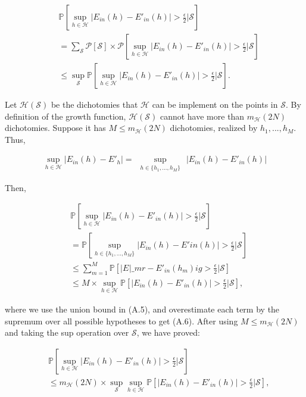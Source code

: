 \begin{align}
    & \ \mathbb{P} \left[\sup_{h \in \mathcal{H}} | E_{in}(h) - E'_{in}(h) | > \frac{\epsilon}{2} \Big\vert \mathcal{S} \right] \nonumber \\ & \ = \sum_{\mathcal{S}} \mathcal{P} \left[\mathcal{S}  \right] \times \mathcal{P} \left[\sup_{h \in \mathcal{H}} |E_{in}(h) - E'_{in}(h) | > \frac{\epsilon}{2} \Big\vert \mathcal{S}  \right] \nonumber \\ & \ \leq \sup_{\mathcal{S}} \mathbb{P} \left[\sup_{h \in \mathcal{H}} | E_{in}(h) - E'_{in}(h) | > \frac{\epsilon}{2} \Big\vert \mathcal{S} \right].
\end{align}

Let $\mathcal{H}(\mathcal{S})$ be the dichotomies that $\mathcal{H}$ can be implement on the points in $\mathcal{S}$. By definition of the growth function, $\mathcal{H}(\mathcal{S})$ cannot have more than $m_{\mathcal{H}}(2N)$ dichotomies. Suppose it has $M \leq m_{\mathcal{H}}(2N)$ dichotomies, realized by $h_1,..., h_M$.
Thus,

\begin{align}
    \sup_{h \in \mathcal{H}} | E_{in}(h) - E'_{h} | = \ \ \sup_{h \in \{h_1,..., h_M\}} \ \ | E_{in}(h) - E'_{in}(h) | \nonumber
\end{align}

Then,

\begin{align}
   & \ \mathbb{P} \left[\sup_{h \in \mathcal{H}} | E_{in}(h) - E'_{in}(h) | > \frac{\epsilon}{2} \Big\vert \mathcal{S} \right] \nonumber \\ & \ = \mathbb{P} \left[\sup_{h \in \{h_1,..., h_M\}} | E_{in}(h) - E'{in}(h) | > \frac{\epsilon}{2} \Big\vert \mathcal{S} \right] \nonumber \\ & \ \leq \sum_{m=1}^M \mathbb{P} \left[| E_{} | \_mr - E'_{in}(h_m)ig > \frac{\epsilon}{2} \Big\vert \mathcal{S} \right] \\ & \ \leq M \times \sup_{h \in \mathcal{H}} \mathbb{P} \left[ | E_{in}(h) - E'_{in}(h) | > \frac{\epsilon}{2} \Big\vert \mathcal{S} \right],
\end{align}

where we use the union bound in (A.5), and overestimate each term by the supremum over all possible hypotheses to get (A.6). After using $M \leq m_{\mathcal{H}}(2N)$ and taking the sup operation over $\mathcal{S}$, we have proved:

\begin{lema}
  \label{lema:A3}
   \begin{align}
     & \ \mathbb{P} \left[\sup_{h \in \mathcal{H}} | E_{in}(h) - E'_{in}(h) | > \frac{\epsilon}{2} \Big\vert \mathcal{S} \right] \nonumber \\ & \
    \leq m_{\mathcal{H}}(2N) \times \sup_{\mathcal{S}} \sup_{h \in \mathcal{H}} \mathbb{P} \left[| E_{in}(h) - E'_{in}(h) | > \frac{\epsilon}{2} \Big\vert \mathcal{S} \right] \nonumber,
   \end{align}
\end{lema}

